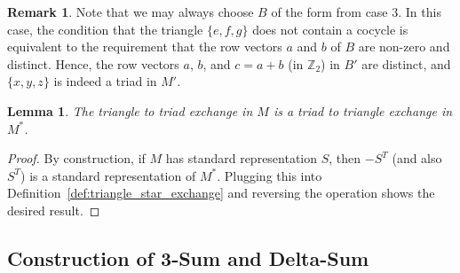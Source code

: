 \documentclass{article}
\newtheorem{lemma}{Lemma}
\theoremstyle{definition}
\newtheorem{remark}{Remark}
\begin{document}
\begin{remark}
    Note that we may always choose $B$ of the form from case 3. In this case, the condition that the triangle $\{e, f, g\}$ does not contain a cocycle is equivalent to the requirement that the row vectors $a$ and $b$ of $B$ are non-zero and distinct. Hence, the row vectors $a$, $b$, and $c = a + b$ (in $\mathbb{Z}_{2}$) in $B'$ are distinct, and $\{x, y, z\}$ is indeed a triad in $M'$.
\end{remark}

\begin{lemma}
    The triangle to triad exchange in $M$ is a triad to triangle exchange in $M^{*}$.
\end{lemma}

\begin{proof}
    By construction, if $M$ has standard representation $S$, then $-S^{T}$ (and also $S^{T}$) is a standard representation of $M^{*}$. Plugging this into Definition~\ref{def:triangle_star_exchange} and reversing the operation shows the desired result.
\end{proof}


\subsection{Construction of 3-Sum and Delta-Sum}
\end{document}
